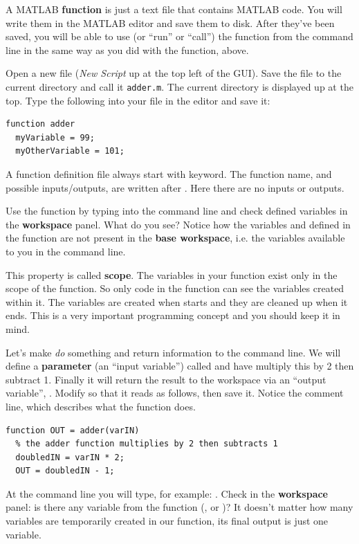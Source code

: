 \documentclass{article}
\begin{document}
A MATLAB \textbf{function} is just a text file that contains MATLAB code.
You will write them in the MATLAB editor and save them to disk.
After they've been saved, you will be able to use (or ``run'' or ``call'') the function from the command line in the same way as you did with the  function, above.

Open a new file (\emph{New Script} up at the top left of the GUI).
Save the file to the current directory and call it \verb|adder.m|.
The current directory is displayed up at the top.
Type the following into your file in the editor and save it:
\begin{lstlisting}
function adder
  myVariable = 99;
  myOtherVariable = 101;
\end{lstlisting}
A function definition file always start with  keyword.
The function name, and possible inputs/outputs, are written after .
Here there are no inputs or outputs.

Use the function by typing  into the command line and check defined variables in the \textbf{workspace} panel. What do you see?
Notice how the variables  and  defined in the  function are not present in the \textbf{base workspace}, i.e. the variables available to you in the command line.

This property is called \textbf{scope}.
The variables in your  function exist only in the scope of the  function.
So only code in the  function can see the variables created within it.
The variables are created when  starts and they are cleaned up when it ends.
This is a very important programming concept and you should keep it in mind.

Let's make  \emph{do} something and return information to the command line.
We will define a \textbf{parameter} (an ``input variable'') called  and have  multiply this by 2 then subtract 1.
Finally it will return the result to the workspace via an ``output variable'', .
Modify  so that it reads as follows, then save it.
Notice the comment line, which describes what the function does.
\begin{lstlisting}
function OUT = adder(varIN)
  % the adder function multiplies by 2 then subtracts 1
  doubledIN = varIN * 2;
  OUT = doubledIN - 1;
\end{lstlisting}

At the command line you will type, for example: .
Check in the \textbf{workspace} panel: is there any variable from the function (,  or )?
It doesn't matter how many variables are temporarily created in our function, its final output is just one variable.
\end{document}
